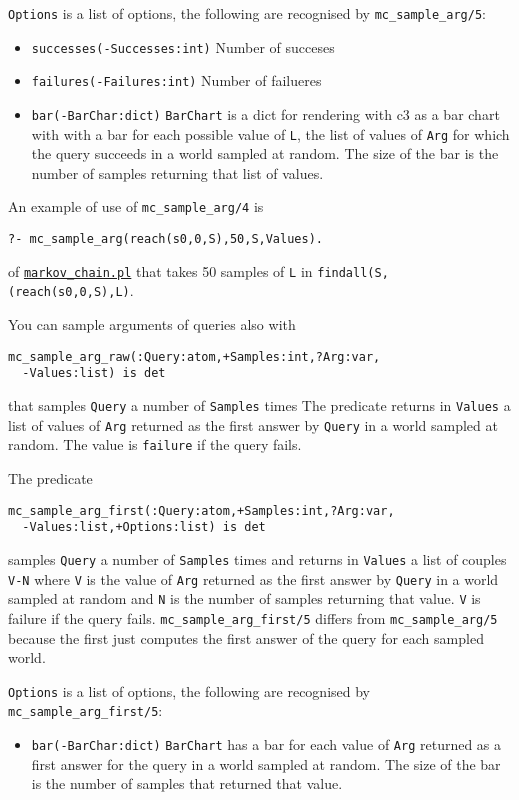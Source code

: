 \verb|Options| is a list of options, the following are recognised by \verb|mc_sample_arg/5|:
\begin{itemize}
\item \verb|successes(-Successes:int)|
Number of succeses
\item \verb|failures(-Failures:int)|
Number of failueres
\item \verb|bar(-BarChar:dict)|
\verb|BarChart| is a dict for rendering with c3 as a bar chart with
 with a bar for each possible value of \verb|L|, the list of values of 
 \verb|Arg| for which the query succeeds in a world sampled at random. 
 The size of the bar is the number of samples
returning that list of values.
\end{itemize}


An example of use of \verb|mc_sample_arg/4| is
\begin{verbatim}
?- mc_sample_arg(reach(s0,0,S),50,S,Values).
\end{verbatim}
of \href{http://cplint.eu/example/inference/markov_chain.pl}{\texttt{markov\_chain.pl}}
that takes 50 samples of \verb|L| in \verb|findall(S,(reach(s0,0,S),L)|.

You can sample arguments of queries also with
\begin{verbatim}
mc_sample_arg_raw(:Query:atom,+Samples:int,?Arg:var,
  -Values:list) is det
\end{verbatim}
that samples \verb|Query| a number of \verb|Samples| times
The predicate returns in \verb|Values| a list of values
of \verb|Arg|  returned as the first answer by \verb|Query|  in
a world sampled at random.
The value is \verb|failure| if the query fails.

The predicate
\begin{verbatim}
mc_sample_arg_first(:Query:atom,+Samples:int,?Arg:var,
  -Values:list,+Options:list) is det
\end{verbatim}
samples \verb|Query| a number of \verb|Samples| times
and returns in \verb|Values| a list of couples \verb|V-N| where
\verb|V| is the value of \verb|Arg| returned as the first answer by \verb|Query| in
a world sampled at random and \verb|N| is the number of samples
returning that value.
\verb|V| is failure if the query fails.
\verb|mc_sample_arg_first/5| differs from \verb|mc_sample_arg/5| because the first just computes the first
answer of the query for each sampled world.

\verb|Options| is a list of options, the following are recognised by \verb|mc_sample_arg_first/5|:
\begin{itemize}
\item \verb|bar(-BarChar:dict)|
  \verb|BarChart| has a bar for each value of \verb|Arg| returned as a first answer for the query in
   a world sampled at random.
   The size of the bar is the number of samples that returned that value.
\end{itemize}

